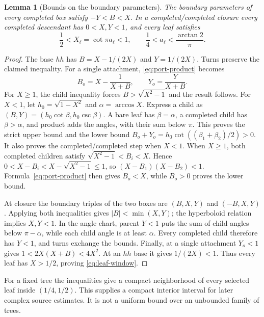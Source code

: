 \documentclass[11pt]{article}
\numberwithin{equation}{section}
\newtheorem{lemma}[theorem]{Lemma}
\theoremstyle{definition}\newtheorem{definition}[theorem]{Definition}
\theoremstyle{remark}\newtheorem{remark}[theorem]{Remark}
\begin{document}
\begin{lemma}[Bounds on the boundary parameters]\label{lem:port-bounds}
The boundary parameters of every completed box satisfy $-Y<B<X$. In a completed/completed closure every completed descendant has $0<X,Y<1$, and every leaf satisfies
\begin{equation}\label{eq:leaf-window}
 \frac12<X_\ell=\cot\pi a_\ell<1,
 \qquad \frac14<a_\ell<\frac{\arctan2}{\pi}.
\end{equation}
\end{lemma}
\begin{proof}
The base $hh$ has $B=X-1/(2X)$ and $Y=1/(2X)$. Turns preserve the claimed inequality. For a single attachment, \eqref{eq:port-product} becomes
\[
 B_o=X-\frac1{X+B},\qquad Y_o=\frac{Y}{X+B}.
\]
For $X\ge1$, the child inequality forces $B>\sqrt{X^2-1}$ and the result follows. For $X<1$, let $h_0=\sqrt{1-X^2}$ and $\alpha=\arccos X$. Express a child as $(B,Y)=(h_0\cot\beta,h_0\csc\beta)$. A bare leaf has $\beta=\alpha$, a completed child has $\beta>\alpha$, and product adds the angles, with their sum below $\pi$. This proves the strict upper bound and the lower bound $B_o+Y_o=h_0\cot((\beta_1+\beta_2)/2)>0$. It also proves the completed/completed step when $X<1$. When $X\ge1$, both completed children satisfy $\sqrt{X^2-1}<B_i<X$. Hence $0<X-B_i<X-\sqrt{X^2-1}\le1$, so $(X-B_1)(X-B_2)<1$. Formula~\eqref{eq:port-product} then gives $B_o<X$, while $B_o>0$ proves the lower bound.

At closure the boundary triples of the two boxes are $(B,X,Y)$ and $(-B,X,Y)$. Applying both inequalities gives $|B|<\min(X,Y)$; the hyperboloid relation implies $X,Y<1$. In the angle chart, parent $Y<1$ puts the sum of child angles below $\pi-\alpha$, while each child angle is at least $\alpha$. Every completed child therefore has $Y<1$, and turns exchange the bounds. Finally, at a single attachment $Y_o<1$ gives
$1<2X(X+B)<4X^2$. At an $hh$ base it gives $1/(2X)<1$. Thus every leaf has $X>1/2$, proving \eqref{eq:leaf-window}.
\end{proof}

For a fixed tree the inequalities give a compact neighborhood of every selected leaf inside $(1/4,1/2)$. This supplies a compact interior interval for later complex source estimates. It is not a uniform bound over an unbounded family of trees.
\end{document}
